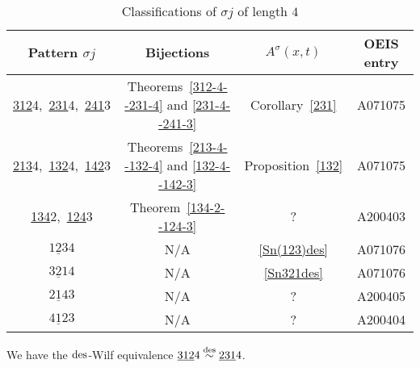 \begin{table}[h!]
\setlength{\tabcolsep}{9pt}  %
\renewcommand{\arraystretch}{1.2}  %
 \begin{center}
 \begin{tabular}{c|c|c|c} 
 Pattern $\sigma j$ & Bijections & $A^{\sigma}(x,t)$ & OEIS entry\\ \hline
 \underline{312}4,\ \underline{231}4,\ \underline{241}3 & Theorems~\ref{312-4--231-4} and \ref{231-4--241-3} & Corollary~\ref{231} & A071075 \\
 \underline{213}4,\ \underline{132}4,\ \underline{142}3 & Theorems~\ref{213-4--132-4} and \ref{132-4--142-3} & Proposition~\ref{132} & A071075\\
 \underline{134}2,\ \underline{124}3 & Theorem~\ref{134-2--124-3} & ? & A200403 \\
 $\underline{123}4$ & N/A & \eqref{Sn(123)des} & A071076 \\ 
 $\underline{321}4$ & N/A & \eqref{Sn321des} & A071076 \\
 $\underline{214}3$ & N/A & ? & A200405 \\ 
 $\underline{412}3$ & N/A & ? & A200404
 \end{tabular}
 \end{center}
 \caption{Classifications of $\sigma j$ of length $4$}
 \label{tab: classifications of length 4}
\end{table}

\begin{theorem}\label{312-4--231-4}
  We have the $\mathrm{des}$-Wilf equivalence $\underline{312}4 \overset{\mathrm{des}}{\sim }\underline{231}4$. 
\end{theorem}

